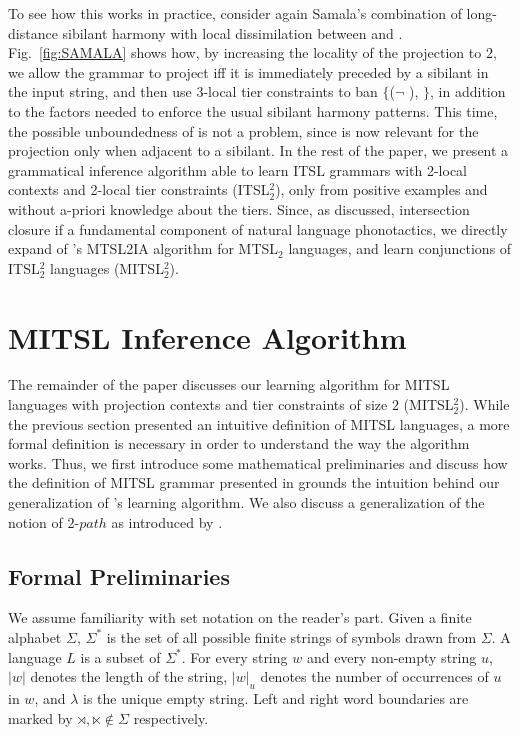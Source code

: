 \documentclass[11pt,a4paper]{article}
\begin{document}
To see how this works in practice, consider again Samala's combination of  long-distance sibilant harmony with local dissimilation between  and .
%
Fig.~\ref{fig:SAMALA} shows how, by increasing the locality of the projection to $2$, we allow the grammar to project  \textipa{[n]} iff it is immediately preceded by a sibilant in the input string, and then use $3$-local tier constraints to ban  $\{$($\neg$ ), $\}$, in addition to the factors needed to enforce the usual sibilant harmony patterns.
%
This time, the possible unboundedness of \textipa{[n]} is not a problem, since \textipa{[n]} is now relevant for the projection only when adjacent to a sibilant.
In the rest of the paper, we present a grammatical inference algorithm able to learn ITSL grammars with 2-local contexts and 2-local tier constraints (ITSL$^2_2$), only from positive examples and without a-priori knowledge about the tiers.
Since, as discussed, intersection closure if a fundamental component of natural language phonotactics, we directly expand of \citet{McMullinSCIL2019}'s MTSL2IA algorithm for MTSL$_2$ languages, and learn conjunctions of ITSL$^2_2$ languages (MITSL$^2_2$).


\section{MITSL Inference Algorithm}

The remainder of the paper discusses our learning algorithm for MITSL languages with projection contexts and tier constraints of size $2$ (MITSL$^2_2$).
While the previous section presented an intuitive definition of MITSL languages, a more formal definition is necessary in order to understand the way the algorithm works.
Thus, we first introduce some mathematical preliminaries and discuss how the definition of MITSL grammar presented in \citep{desanto2019structure}  grounds the intuition behind our generalization of \citet{McMullinSCIL2019}'s learning algorithm. 
We also discuss a generalization of the notion of  $2\text{-}path$ as introduced by \citet{JardineHeinz2016}.


\subsection{Formal Preliminaries}

We assume familiarity with set notation on the reader's part.
Given a finite alphabet $\Sigma$, $\Sigma^*$ is the set of all possible finite strings of symbols drawn from $\Sigma$. %
A language $L$ is a subset of $\Sigma^*$.
For every string $w$ and every non-empty string $u$, $|w|$ denotes the length of the string, $|w|_u$ denotes the number of occurrences of $u$ in $w$, and $\lambda$ is the unique empty string.
Left and right word boundaries are marked by  $\rtimes, \ltimes \notin \Sigma$ respectively.
\end{document}
